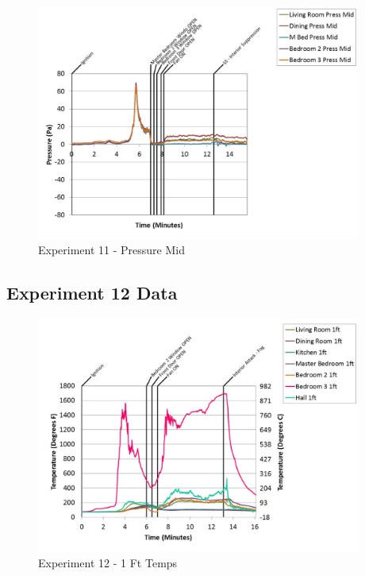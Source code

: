 \documentclass{article}
\begin{document}
\begin{appendices}
	\begin{figure}[h!]
		\centering
		\includegraphics[height=3.05in]{0_Images/Results_Charts/Exp_11_Charts/PressureMid.pdf}
		\caption{Experiment 11 - Pressure Mid}
	\end{figure}
 
	\clearpage

		\clearpage
\clearpage		\large
\subsection{Experiment 12 Data} \label{App:Exp12Results} 

	\begin{figure}[h!]
		\centering
		\includegraphics[height=3.05in]{0_Images/Results_Charts/Exp_12_Charts/1FtTemps.pdf}
		\caption{Experiment 12 - 1 Ft Temps}
	\end{figure}
 


\end{appendices}
\end{document}

